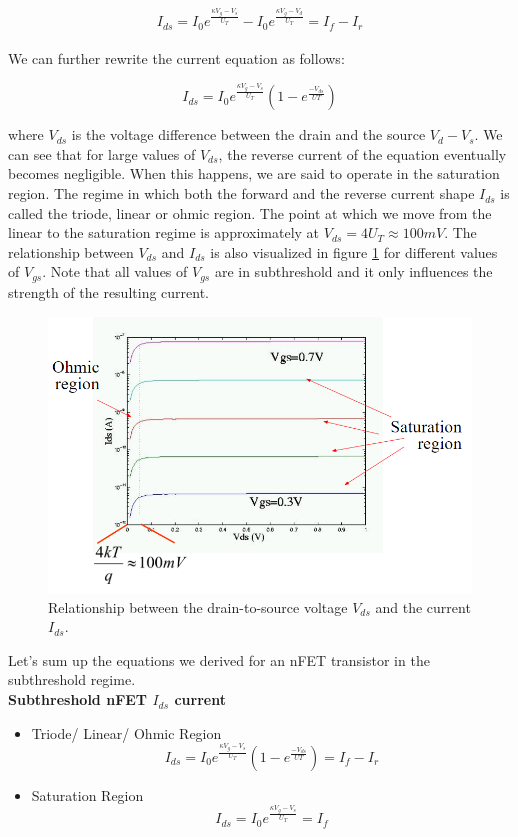 \begin{equation}
    I_{ds} = I_0 e^{\frac{\kappa V_g - V_s}{U_T}} - I_0 e^{\frac{\kappa V_g - V_d}{U_T}} = I_f - I_r
\end{equation}\\

We can further rewrite the current equation as follows:

\begin{equation}
    I_{ds} = I_0 e^{\frac{\kappa V_g - V_s}{U_T}} (1 - e^{\frac{-V_{ds}}{UT}}) \label{eq:satsubcurrent}
\end{equation}

where $V_{ds}$ is the voltage difference between the drain and the source $V_d - V_s$. We can see that for large values of $V_{ds}$, the reverse current of the equation eventually becomes negligible. When this happens, we are said to operate in the saturation region. The regime in which both the forward and the reverse current shape $I_{ds}$ is called the triode, linear or ohmic region. The point at which we move from the linear to the saturation regime is approximately at $V_{ds} = 4 U_T \approx 100 mV$. The relationship between $V_{ds}$ and $I_{ds}$ is also visualized in figure \ref{fig:vsd_vs_ids} for different values of $V_{gs}$. Note that all values of $V_{gs}$ are in subthreshold and it only influences the strength of the resulting current.\\

\begin{figure}
    \centering
    \includegraphics[width=.8\linewidth]{Figures/Vds_vs_Ids.PNG}
    \caption{Relationship between the drain-to-source voltage $V_{ds}$ and the current $I_{ds}$.}
    \label{fig:vsd_vs_ids}
\end{figure}

Let's sum up the equations we derived for an nFET transistor in the subthreshold regime.\\

\textbf{Subthreshold nFET $I_{ds}$ current}
\begin{itemize}
    \item Triode/ Linear/ Ohmic Region
    \begin{equation}
        I_{ds} = I_0 e^{\frac{\kappa V_g - V_s}{U_T}} (1 - e^{\frac{-V_{ds}}{UT}}) = I_f - I_r
    \end{equation}
    \item Saturation Region
    \begin{equation}
        I_{ds} = I_0 e^{\frac{\kappa V_g - V_s}{U_T}} = I_f
    \end{equation}
\end{itemize}